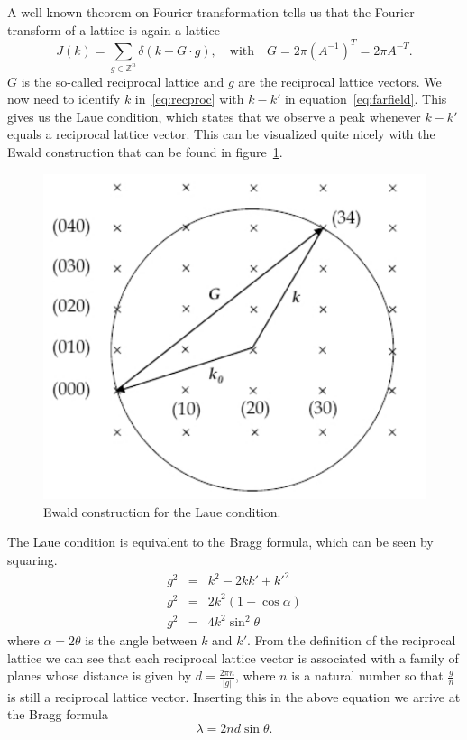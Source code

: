 \documentclass[a4paper,10pt]{scrartcl}
\begin{document}
A well-known theorem on Fourier transformation tells us that the Fourier transform of a lattice is again a lattice
\begin{equation}
J(k)=\sum_{g\in\mathbb{Z}^{n}}\delta(k-G \cdot g),\quad \mbox{with} \quad G=2\pi(A^{-1})^{T}=2\pi A^{-T}. \label{eq:recproc}
\end{equation}
$G$ is the so-called reciprocal lattice and $g$ are the reciprocal lattice vectors. We now need to identify $k$ in~\eqref{eq:recproc} with $k-k'$ in equation~\eqref{eq:farfield}. This gives us the Laue condition, which states that we observe a peak whenever $k-k'$ equals a reciprocal lattice vector. This can be visualized quite nicely with the Ewald construction that can be found in figure~\ref{fig:ewald}.

\begin{figure}
\centering
\includegraphics[scale=0.7]{img/ewald}
\caption{Ewald construction for the Laue condition. \label{fig:ewald}}
\end{figure}

The Laue condition is equivalent to the Bragg formula, which can be seen by squaring.
\begin{eqnarray}
g^{2} & = & k^{2}-2kk'+k'^{2} \\  
g^{2} & = & 2k^{2} (1-\cos \alpha) \\
g^{2} & = & 4k^{2}\sin^{2}\theta \label{eq:prebragg}
\end{eqnarray}
where $\alpha = 2 \theta$ is the angle between $k$ and $k'$. From the definition of the reciprocal lattice we can see that each reciprocal lattice vector is associated with a family of planes whose distance is given by $d=\tfrac{2\pi n}{|g|}$, where $n$ is a natural number so that $\tfrac{g}{n}$ is still a reciprocal lattice vector. Inserting this in the above equation we arrive at the Bragg formula
\begin{equation}
\lambda=2nd\sin\theta. \label{eq:bragg}
\end{equation}
\end{document}
